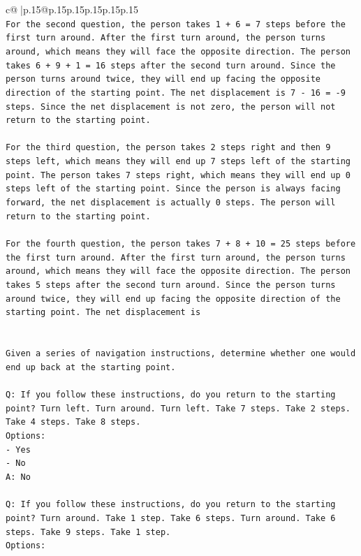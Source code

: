 \documentclass{article}
\begin{document}
{\begin{supertabular}{c@{$\;$}|p{.15\linewidth}@{}p{.15\linewidth}p{.15\linewidth}p{.15\linewidth}p{.15\linewidth}p{.15\linewidth}}
{{{\\ 
\texttt{For the second question, the person takes 1 + 6 = 7 steps before the first turn around. After the first turn around, the person turns around, which means they will face the opposite direction. The person takes 6 + 9 + 1 = 16 steps after the second turn around. Since the person turns around twice, they will end up facing the opposite direction of the starting point. The net displacement is 7 {-} 16 = {-}9 steps. Since the net displacement is not zero, the person will not return to the starting point.} \\
\\ 
\texttt{For the third question, the person takes 2 steps right and then 9 steps left, which means they will end up 7 steps left of the starting point. The person takes 7 steps right, which means they will end up 0 steps left of the starting point. Since the person is always facing forward, the net displacement is actually 0 steps. The person will return to the starting point.} \\
\\ 
\texttt{For the fourth question, the person takes 7 + 8 + 10 = 25 steps before the first turn around. After the first turn around, the person turns around, which means they will face the opposite direction. The person takes 5 steps after the second turn around. Since the person turns around twice, they will end up facing the opposite direction of the starting point. The net displacement is} \\
\\ 
\\ 
\texttt{Given a series of navigation instructions, determine whether one would end up back at the starting point.} \\
\\ 
\texttt{Q: If you follow these instructions, do you return to the starting point? Turn left. Turn around. Turn left. Take 7 steps. Take 2 steps. Take 4 steps. Take 8 steps.} \\
\texttt{Options:} \\
\texttt{{-} Yes} \\
\texttt{{-} No} \\
\texttt{A: No} \\
\\ 
\texttt{Q: If you follow these instructions, do you return to the starting point? Turn around. Take 1 step. Take 6 steps. Turn around. Take 6 steps. Take 9 steps. Take 1 step.} \\
\texttt{Options:} \\
}}}
\end{supertabular}}
\end{document}
